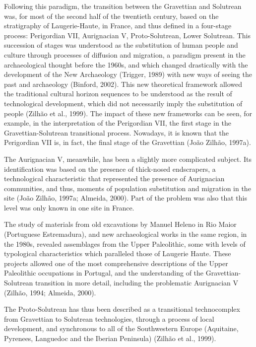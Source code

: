 \documentclass[12pt,twoside]{reedthesis}
\begin{document}
Following this paradigm, the transition between the Gravettian and Solutrean was, for most of the second half of the twentieth century, based on the stratigraphy of Laugerie-Haute, in France, and thus defined in a four-stage process: Perigordian VII, Aurignacian V, Proto-Solutrean, Lower Solutrean. This succession of stages was understood as the substitution of human people and culture through processes of diffusion and migration, a paradigm present in the archaeological thought before the 1960s, and which changed drastically with the development of the New Archaeology (Trigger, 1989) with new ways of seeing the past and archaeology (Binford, 2002). This new theoretical framework allowed the traditional cultural horizon sequences to be understood as the result of technological development, which did not necessarily imply the substitution of people (Zilhão et al., 1999). The impact of these new frameworks can be seen, for example, in the interpretation of the Perigordian VII, the first stage in the Gravettian-Solutrean transitional process. Nowadays, it is known that the Perigordian VII is, in fact, the final stage of the Gravettian (João Zilhão, 1997a).

The Aurignacian V, meanwhile, has been a slightly more complicated subject. Its identification was based on the presence of thick-nosed endscrapers, a technological characteristic that represented the presence of Aurignacian communities, and thus, moments of population substitution and migration in the site (João Zilhão, 1997a; Almeida, 2000). Part of the problem was also that this level was only known in one site in France.

The study of materials from old excavations by Manuel Heleno in Rio Maior (Portuguese Estremadura), and new archaeological works in the same region, in the 1980s, revealed assemblages from the Upper Paleolithic, some with levels of typological characteristics which paralleled those of Laugerie Haute. These projects allowed one of the most comprehensive descriptions of the Upper Paleolithic occupations in Portugal, and the understanding of the Gravettian-Solutrean transition in more detail, including the problematic Aurignacian V (Zilhão, 1994; Almeida, 2000).

The Proto-Solutrean has thus been described as a transitional technocomplex from Gravettian to Solutrean technologies, through a process of local development, and synchronous to all of the Southwestern Europe (Aquitaine, Pyrenees, Languedoc and the Iberian Peninsula) (Zilhão et al., 1999).
\end{document}
